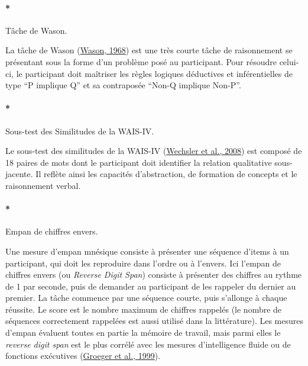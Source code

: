 \documentclass[
  12pt,
]{article}
\let\oldparagraph\paragraph
\renewcommand{\paragraph}[1]{\oldparagraph{#1}\mbox{}}
\begin{document}
\hypertarget{tuxe2che-de-wason.}{%
\paragraph*{Tâche de Wason.}\label{tuxe2che-de-wason.}}

La tâche de Wason (\protect\hyperlink{ref-wasonReasoningRule1968}{Wason,
1968}) est une très courte tâche de raisonnement se présentant sous la
forme d'un problème posé au participant. Pour résoudre celui-ci, le
participant doit maîtriser les règles logiques déductives et
inférentielles de type ``P implique Q'' et sa contraposée ``Non-Q
implique Non-P''.

\hypertarget{sous-test-des-similitudes-de-la-wais-iv.}{%
\paragraph*{Sous-test des Similitudes de la
WAIS-IV.}\label{sous-test-des-similitudes-de-la-wais-iv.}}

Le sous-test des similitudes de la WAIS-IV
(\protect\hyperlink{ref-wechslerWechslerAdultIntelligence2008}{Wechsler
et al., 2008}) est composé de 18 paires de mots dont le participant doit
identifier la relation qualitative sous-jacente. Il reflète ainsi les
capacités d'abstraction, de formation de concepts et le raisonnement
verbal.

\hypertarget{empan-de-chiffres-envers.}{%
\paragraph*{Empan de chiffres envers.}\label{empan-de-chiffres-envers.}}

Une mesure d'empan mnésique consiste à présenter une séquence d'items à
un participant, qui doit les reproduire dans l'ordre ou à l'envers. Ici
l'empan de chiffres envers (ou \emph{Reverse Digit Span}) consiste à
présenter des chiffres au rythme de 1 par seconde, puis de demander au
participant de les rappeler du dernier au premier. La tâche commence par
une séquence courte, puis s'allonge à chaque réussite. Le score est le
nombre maximum de chiffres rappelés (le nombre de séquences correctement
rappelées est aussi utilisé dans la littérature). Les mesures d'empan
évaluent toutes en partie la mémoire de travail, mais parmi elles le
\emph{reverse digit span} est le plus corrélé avec les mesures
d'intelligence fluide ou de fonctions exécutives
(\protect\hyperlink{ref-groegerMeasuringMemorySpan1999}{Groeger et al.,
1999}).
\end{document}
